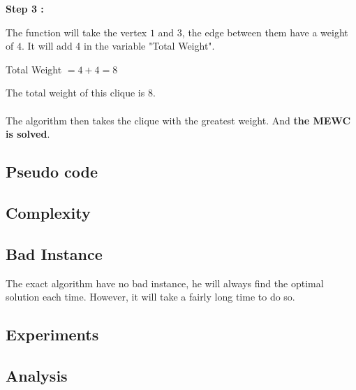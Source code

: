     \hspace*{1cm}  \textbf{Step 3 :}
    \\
    \begin{minipage}{0.4\textwidth}
    \end{minipage}
    \begin{minipage}{0.6\textwidth}
        The function will take the vertex $1$ and $3$, the edge between them have a weight of $4$. It will add 4 in the variable "Total Weight".
    \end{minipage}
    \begin{center}
        Total Weight $= 4 + 4 = 8$
    \end{center}

    The total weight of this clique is 8.
    \\ \\
    The algorithm then takes the clique with the greatest weight. And \textbf{the MEWC is solved}.


\subsection{Pseudo code}


\subsection{Complexity}


\subsection{Bad Instance}
    
    The exact algorithm have no bad instance, he will always find the optimal solution each time. However, it will take a fairly long time to do so.


\subsection{Experiments}


\subsection{Analysis}
